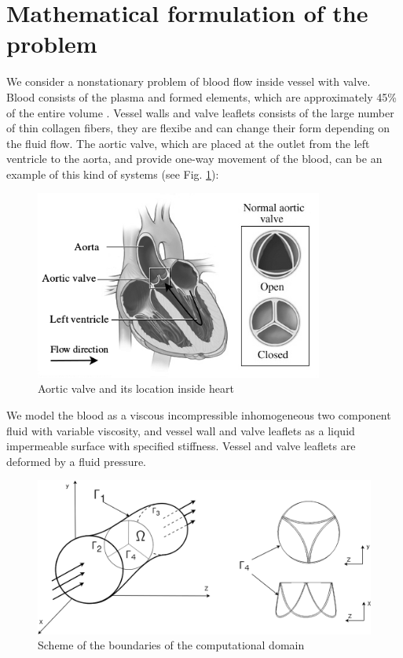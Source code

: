 \documentclass[runningheads,a4paper]{llncs}
\begin{document}
\section{Mathematical formulation of the problem}

We consider a nonstationary problem of blood flow inside vessel with valve. Blood consists of the plasma and formed elements, which are approximately
45\% of the entire volume \cite{karro}. Vessel walls and valve leaflets consists of the large number of thin collagen fibers, they are flexibe
and can change their form depending on the fluid flow. The aortic valve, which are placed at the outlet from the left ventricle to the aorta, and provide
one-way movement of the blood, can be an example of this kind of systems (see Fig. \ref{fig:aortic_valve_example}):

\begin{figure}
\centering
\includegraphics[height=6.2cm]{images/aorta_scheme_gray.png}
\caption{Aortic valve and its location inside heart}
\label{fig:aortic_valve_example}
\end{figure}

We model the blood as a viscous incompressible inhomogeneous two component fluid with variable viscosity, and vessel wall and valve leaflets as a
liquid impermeable surface with specified stiffness. Vessel and valve leaflets are deformed by a fluid pressure.

\begin{figure}
\centering
\includegraphics[width=12.5cm]{images/area_3d.png}
\caption{Scheme of the boundaries of the computational domain}
\label{fig:area_3d}
\end{figure}
\end{document}
